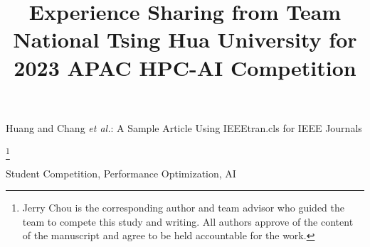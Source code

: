 \documentclass[lettersize,journal]{IEEEtran}
\newcommand\blfootnote[1]{%
  \begingroup
  \renewcommand\thefootnote{}\footnote{#1}%
  \addtocounter{footnote}{-1}%
  \endgroup
}
\begin{document}
\title{Experience Sharing from Team National Tsing Hua University for 2023 APAC HPC-AI Competition}


\author{
}

%
{Huang and Chang \MakeLowercase{\textit{et al.}}: A Sample Article Using IEEEtran.cls for IEEE Journals}


\maketitle

\blfootnote{Jerry Chou is the corresponding author and team advisor who guided the team to compete this study and writing. All authors approve of the content of the manuscript and agree to be held accountable for the work.}





\begin{IEEEkeywords}
Student Competition, Performance Optimization, AI\end{IEEEkeywords}












\end{document}
